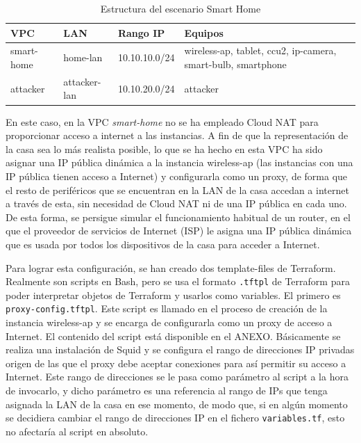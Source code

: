   \begin{table}[h]
    \begin{center}
      \begin{tabular}{ | m{5cm} | w{c}{2cm} | w{c}{2,5cm} | m{4,75cm} | }
        \hline{} \centering\textbf{VPC} & \textbf{LAN} & \textbf{Rango IP} & \textbf{Equipos} \\ \hline
        smart-home & home-lan & 10.10.10.0/24 & wireless-ap, tablet, ccu2, ip-camera, smart-bulb, smartphone \\ \hline{}
        attacker & attacker-lan & 10.10.20.0/24 & attacker \\ \hline 
        \end{tabular}
      \caption{Estructura del escenario Smart Home}
      \label{tab:vpc3}
    \end{center}
  \end{table}

  En este caso, en la VPC \textit{smart-home} no se ha empleado Cloud NAT para proporcionar acceso a internet a las instancias. A fin de que la representación de la casa sea lo más realista posible, lo que se ha hecho en esta VPC ha sido asignar una IP pública dinámica a la instancia wireless-ap (las instancias con una IP pública tienen acceso a Internet) y configurarla como un proxy, de forma que el resto de periféricos que se encuentran en la LAN de la casa accedan a internet a través de esta, sin necesidad de Cloud NAT ni de una IP pública en cada uno. De esta forma, se persigue simular el funcionamiento habitual de un router, en el que el proveedor de servicios de Internet (ISP) le asigna una IP pública dinámica que es usada por todos los dispositivos de la casa para acceder a Internet. 

  Para lograr esta configuración, se han creado dos template-files de Terraform. Realmente son scripts en Bash, pero se usa el formato \texttt{.tftpl} de Terraform para poder interpretar objetos de Terraform y usarlos como variables. El primero es \texttt{proxy-config.tftpl}. Este script es llamado en el proceso de creación de la instancia wireless-ap y se encarga de configurarla como un proxy de acceso a Internet. El contenido del script está disponible en el ANEXO. Básicamente se realiza una instalación de Squid y se configura el rango de direcciones IP privadas origen de las que el proxy debe aceptar conexiones para así permitir su acceso a Internet. Este rango de direcciones se le pasa como parámetro al script a la hora de invocarlo, y dicho parámetro es una referencia al rango de IPs que tenga asignada la LAN de la casa en ese momento, de modo que, si en algún momento se decidiera cambiar el rango de direcciones IP en el fichero \texttt{variables.tf}, esto no afectaría al script en absoluto.

